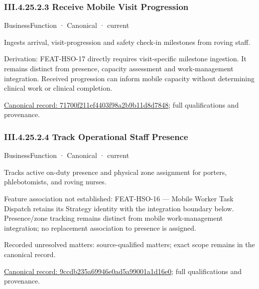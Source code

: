 \subsubsection*{III.4.25.2.3 Receive Mobile Visit Progression}
\label{navigation:III.4.25.2.3}

\label{element:71700f211ef4403f98a2b9b11d8d7848}
{\small BusinessFunction · Canonical · current}\par

Ingests arrival, visit-progression and safety check-in milestones from roving staff.



Derivation: FEAT-HSO-17 directly requires visit-specific milestone ingestion. It remains distinct from presence, capacity assessment and work-management integration. Received progression can inform mobile capacity without determining clinical work or clinical completion.


{\footnotesize \href{../../../../continuum/business/business-function/71700f211ef4403f98a2b9b11d8d7848.md}{Canonical record: 71700f211ef4403f98a2b9b11d8d7848}; full qualifications and provenance.}\par
\subsubsection*{III.4.25.2.4 Track Operational Staff Presence}
\label{navigation:III.4.25.2.4}

\label{element:9ccdb235a69946e0ad5a99001a1d16e0}
{\small BusinessFunction · Canonical · current}\par

Tracks active on-duty presence and physical zone assignment for porters, phlebotomists, and roving nurses.



Feature association not established: FEAT-HSO-16 — Mobile Worker Task Dispatch retains its Strategy identity with the integration boundary below. Presence/zone tracking remains distinct from mobile work-management integration; no replacement association to presence is assigned.


{\small Recorded unresolved matters: source-qualified matters; exact scope remains in the canonical record.}\par
{\footnotesize \href{../../../../continuum/business/business-function/9ccdb235a69946e0ad5a99001a1d16e0.md}{Canonical record: 9ccdb235a69946e0ad5a99001a1d16e0}; full qualifications and provenance.}\par
